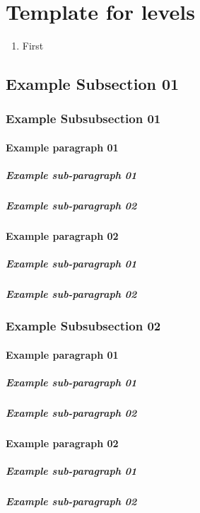 \documentclass[letterpaper, 11pt]{article}
\newcounter{subsubparagraph}
\begin{document}
	\newpage
\section{Template for levels}
	\begin{enumerate}
		\item{First}
	\end{enumerate}
	\subsection{Example Subsection 01}
		\subsubsection{Example Subsubsection 01}
			\paragraph{Example paragraph 01}
				\subparagraph{Example sub-paragraph 01}
				\subparagraph{Example sub-paragraph 02}
			\paragraph{Example paragraph 02}
				\subparagraph{Example sub-paragraph 01}
				\subparagraph{Example sub-paragraph 02}
		\subsubsection{Example Subsubsection 02}
			\paragraph{Example paragraph 01}
				\subparagraph{Example sub-paragraph 01}
				\subparagraph{Example sub-paragraph 02}
			\paragraph{Example paragraph 02}
				\subparagraph{Example sub-paragraph 01}
				\subparagraph{Example sub-paragraph 02}
\end{document}
